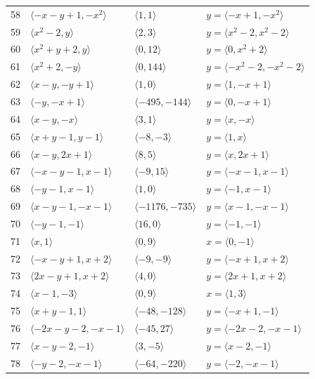 \documentclass[11pt]{article}
\begin{document}
\begin{longtable}{@{}rlll@{}}
58 & $\langle -x-y+1,-x^{2}\rangle$ & $\langle 1,1\rangle$ & $y=\langle -x+1,-x^{2}\rangle$\\
59 & $\langle x^{2}-2,y\rangle$ & $\langle 2,3\rangle$ & $y=\langle x^{2}-2,x^{2}-2\rangle$\\
60 & $\langle x^{2}+y+2,y\rangle$ & $\langle 0,12\rangle$ & $y=\langle 0,x^{2}+2\rangle$\\
61 & $\langle x^{2}+2,-y\rangle$ & $\langle 0,144\rangle$ & $y=\langle -x^{2}-2,-x^{2}-2\rangle$\\
62 & $\langle x-y,-y+1\rangle$ & $\langle 1,0\rangle$ & $y=\langle 1,-x+1\rangle$\\
63 & $\langle -y,-x+1\rangle$ & $\langle -495,-144\rangle$ & $y=\langle 0,-x+1\rangle$\\
64 & $\langle x-y,-x\rangle$ & $\langle 3,1\rangle$ & $y=\langle x,-x\rangle$\\
65 & $\langle x+y-1,y-1\rangle$ & $\langle -8,-3\rangle$ & $y=\langle 1,x\rangle$\\
66 & $\langle x-y,2x+1\rangle$ & $\langle 8,5\rangle$ & $y=\langle x,2x+1\rangle$\\
67 & $\langle -x-y-1,x-1\rangle$ & $\langle -9,15\rangle$ & $y=\langle -x-1,x-1\rangle$\\
68 & $\langle -y-1,x-1\rangle$ & $\langle 1,0\rangle$ & $y=\langle -1,x-1\rangle$\\
69 & $\langle x-y-1,-x-1\rangle$ & $\langle -1176,-735\rangle$ & $y=\langle x-1,-x-1\rangle$\\
70 & $\langle -y-1,-1\rangle$ & $\langle 16,0\rangle$ & $y=\langle -1,-1\rangle$\\
71 & $\langle x,1\rangle$ & $\langle 0,9\rangle$ & $x=\langle 0,-1\rangle$\\
72 & $\langle -x-y+1,x+2\rangle$ & $\langle -9,-9\rangle$ & $y=\langle -x+1,x+2\rangle$\\
73 & $\langle 2x-y+1,x+2\rangle$ & $\langle 4,0\rangle$ & $y=\langle 2x+1,x+2\rangle$\\
74 & $\langle x-1,-3\rangle$ & $\langle 0,9\rangle$ & $x=\langle 1,3\rangle$\\
75 & $\langle x+y-1,1\rangle$ & $\langle -48,-128\rangle$ & $y=\langle -x+1,-1\rangle$\\
76 & $\langle -2x-y-2,-x-1\rangle$ & $\langle -45,27\rangle$ & $y=\langle -2x-2,-x-1\rangle$\\
77 & $\langle x-y-2,-1\rangle$ & $\langle 3,-5\rangle$ & $y=\langle x-2,-1\rangle$\\
78 & $\langle -y-2,-x-1\rangle$ & $\langle -64,-220\rangle$ & $y=\langle -2,-x-1\rangle$\\

\end{longtable}
\end{document}
